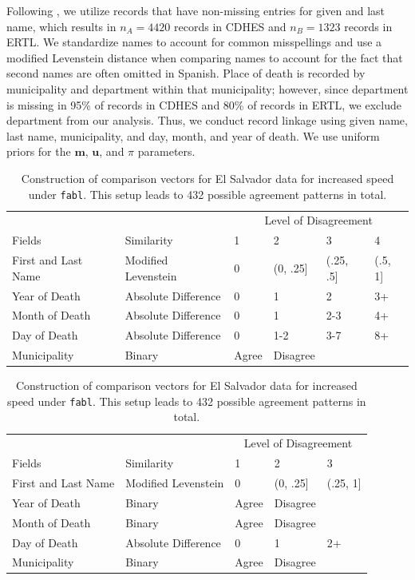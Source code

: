 \documentclass[ba]{imsart}
\begin{document}
	Following \cite{sadinle_bayesian_2017}, we utilize records that have non-missing entries for given and last name, which results in $n_A = 4420$ records in CDHES and $n_B = 1323$ records in ERTL. We standardize names to account for common misspellings and use a modified Levenstein distance when comparing names to account for the fact that second names are often omitted in Spanish. Place of death is recorded by municipality and department within that municipality; however, since department is missing in 95\% of records in CDHES and 80\% of records in ERTL, we exclude department from our analysis. Thus, we conduct record linkage using given name, last name, municipality, and day, month, and year of death. We use uniform priors for the $\bm{m}$, $\bm{u}$, and $\pi$ parameters.
	
	\begin{table}[!t]
		\begin{tabular}[t]{llllll}
			\multicolumn{2}{c}{ } & \multicolumn{4}{c}{Level of Disagreement} \\
			\cline{3-6}
			Fields & Similarity & 1 & 2 & 3 & 4\\
			\hline
			First and Last Name & Modified Levenstein & 0 & (0, .25] & (.25, .5] & (.5, 1]\\
			Year of Death & Absolute Difference & 0 & 1 & 2 & 3+\\
			Month of Death & Absolute Difference & 0 & 1 & 2-3 & 4+\\
			Day of Death & Absolute Difference & 0 & 1-2 & 3-7 & 8+\\
			Municipality & Binary & Agree & Disagree &  & \\
			\hline
		\end{tabular}
		\caption{Construction of comparison vectors for El Salvador data resembling original implementation from \cite{sadinle_bayesian_2017}. This setup leads to 1875 possible agreement patterns in total.}\label{Tab:el_salvador_cutoffs_1}

		\centering
		\begin{tabular}[t]{lllll}
			\multicolumn{2}{c}{ } & \multicolumn{3}{c}{Level of Disagreement} \\
			\cline{3-5}
			Fields & Similarity & 1 & 2 & 3\\
			\hline
			First and Last Name & Modified Levenstein & 0 & (0, .25] & (.25, 1]\\
			Year of Death & Binary & Agree & Disagree & \\
			Month of Death & Binary & Agree & Disagree & \\
			Day of Death & Absolute Difference & 0 & 1 & 2+\\
			Municipality & Binary & Agree & Disagree & \\
			\hline
		\end{tabular}
		\caption{Construction of comparison vectors for El Salvador data for increased speed under \texttt{fabl}. This setup leads to 432 possible agreement patterns in total.}\label{Tab:el_salvador_cutoffs_2}
	\end{table}
\end{document}
